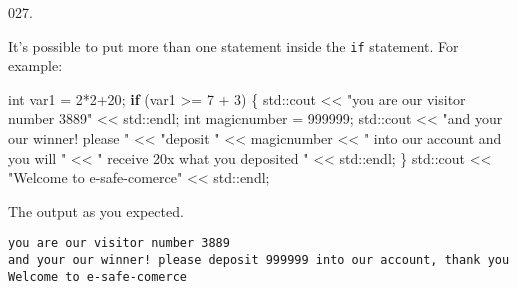 \documentclass[]{book}
\newenvironment{Shaded}{}{}
\newcommand{\BuiltInTok}[1]{#1}
\newcommand{\ControlFlowTok}[1]{\textcolor[rgb]{0.00,0.44,0.13}{\textbf{#1}}}
\newcommand{\DataTypeTok}[1]{\textcolor[rgb]{0.56,0.13,0.00}{#1}}
\newcommand{\DecValTok}[1]{\textcolor[rgb]{0.25,0.63,0.44}{#1}}
\newcommand{\NormalTok}[1]{#1}
\newcommand{\StringTok}[1]{\textcolor[rgb]{0.25,0.44,0.63}{#1}}
\begin{document}
\begin{minipage}{\linewidth}
\begin{minipage}[t]{.485\linewidth}
\begin{framed}
\end{framed}

\end{minipage}
\end{minipage}

\vspace{2mm}\noindent\hrulefill{}

\begin{minipage}{\linewidth}\noindent
{\tiny 027.}\\
\begin{minipage}[t]{.485\linewidth}

It's possible to put more than one statement inside the \texttt{if}
statement. For example:

\begin{framed}

\begin{Shaded}
\begin{Highlighting}[]
\DataTypeTok{int}\NormalTok{ var1 = }\DecValTok{2}\NormalTok{*}\DecValTok{2+20}\NormalTok{;}
\ControlFlowTok{if}\NormalTok{ (var1 >= }\DecValTok{7}\NormalTok{ + }\DecValTok{3}\NormalTok{) \{}
  \BuiltInTok{std::}\NormalTok{cout}
\NormalTok{    << }\StringTok{"you are our visitor number 3889"}
\NormalTok{    << }\BuiltInTok{std::}\NormalTok{endl;}
  \DataTypeTok{int}\NormalTok{ magicnumber = }\DecValTok{999999}\NormalTok{;}
  \BuiltInTok{std::}\NormalTok{cout}
\NormalTok{    << }\StringTok{"and your our winner! please "}
\NormalTok{    << }\StringTok{"deposit "}\NormalTok{ << magicnumber}
\NormalTok{    << }\StringTok{" into our account and you will "}
\NormalTok{    << }\StringTok{" receive 20x what you deposited "}
\NormalTok{    << }\BuiltInTok{std::}\NormalTok{endl;}
\NormalTok{\}}
\BuiltInTok{std::}\NormalTok{cout}
\NormalTok{  << }\StringTok{"Welcome to e-safe-comerce"}
\NormalTok{  << }\BuiltInTok{std::}\NormalTok{endl;}
\end{Highlighting}
\end{Shaded}

\end{framed}

\end{minipage}
\hfill
\begin{minipage}[t]{.485\linewidth}

The output as you expected.

\begin{framed}

\begin{verbatim}
you are our visitor number 3889
and your our winner! please deposit 999999 into our account, thank you
Welcome to e-safe-comerce
\end{verbatim}

\end{framed}

\end{minipage}
\end{minipage}
\end{document}
